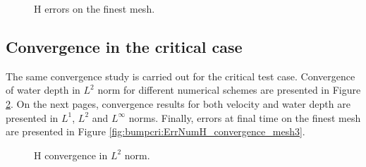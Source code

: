 \begin{figure}[H]
\centering
  \caption{H errors on the finest mesh.}
\label{fig:bump:ErrNumH_convergence_mesh3}
\end{figure}


\subsection{Convergence in the critical case}

The same convergence study is carried out for the critical test case.
Convergence of water depth in $L^2$ norm for different numerical schemes are presented in Figure \ref{fig:bumpcri:ErrNumH_convergence}. On the next pages, convergence results for both velocity and water depth
are presented in $L^1$, $L^2$ and $L^{\infty}$ norms. Finally, errors at final time on the finest mesh are presented in Figure \ref{fig:bumpcri:ErrNumH_convergence_mesh3}.

\begin{figure}[H]
\centering
  \caption{H convergence in $L^2$ norm.}
\label{fig:bumpcri:ErrNumH_convergence}
\end{figure}

